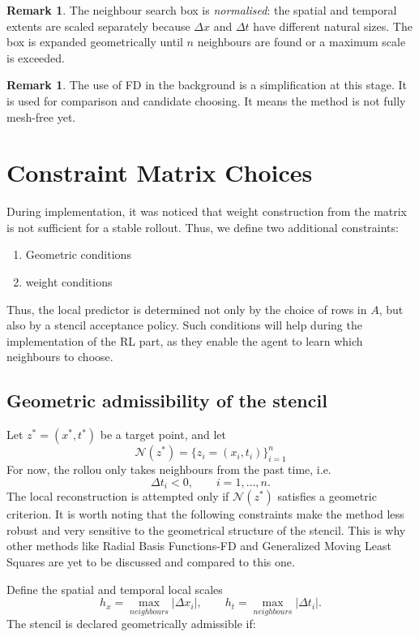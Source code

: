 \documentclass[12pt, a4paper, twoside]{report}
\theoremstyle{plain}
\theoremstyle{definition}
\newtheorem{remark}[theorem]{Remark}
\begin{document}
\begin{remark}
The neighbour search box is \emph{normalised}: the spatial and
temporal extents are scaled separately because $\Delta x$ and
$\Delta t$ have different natural sizes.
The box is expanded geometrically until $n$ neighbours are found
or a maximum scale is exceeded.
\end{remark}

\begin{remark}
The use of FD in the background is a simplification at this stage. It is used for comparison and candidate choosing.
It means the method is not fully mesh-free yet.
\end{remark}
\pagebreak
\section{Constraint Matrix Choices}
During implementation, it was noticed that weight construction from the matrix is not sufficient for a stable rollout.
Thus, we define two additional constraints:
\begin{enumerate}
    \item Geometric conditions
    \item weight conditions 
\end{enumerate}
Thus, the local predictor is determined not only by the choice of rows in $A$, but also by a stencil acceptance policy. Such conditions will help during the implementation of the RL part, as they enable the agent to learn which neighbours to choose. 
\subsection{Geometric admissibility of the stencil}

Let $z^* = (x^*,t^*)$ be a target point, and let
\[
\mathcal N(z^*) = \{z_i = (x_i,t_i)\}_{i=1}^n
\] 
For now, the rollou only takes neighbours from the past time, i.e.
\[
\Delta t_i < 0, \qquad i=1,\dots,n.
\]
The local reconstruction is attempted only if $\mathcal N(z^*)$ satisfies a geometric criterion. It is worth noting that the following constraints make the method less robust and very sensitive to the geometrical structure of the stencil. This is why other methods like Radial Basis Functions-FD and Generalized Moving Least Squares are yet to be discussed and compared to this one. 

Define the spatial and temporal local scales
\[
h_x = \max_{neighbours} |\Delta x_i|, \qquad
h_t = \max_{neighbours} |\Delta t_i|.
\]
The stencil is declared geometrically admissible if:
\end{document}
